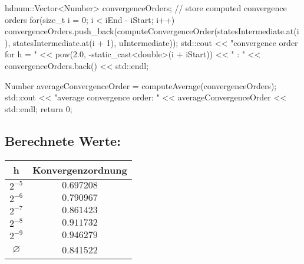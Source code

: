 \documentclass[10pt,oneside,a4paper]{scrartcl}
\begin{document}
\begin{cppcode}
{    hdnum::Vector<Number> convergenceOrders;     // store computed convergence orders
    for(size_t i = 0; i < iEnd - iStart; i++) {
      convergenceOrders.push_back(computeConvergenceOrder(statesIntermediate.at(i), statesIntermediate.at(i + 1), uIntermediate));
      std::cout << "convergence order for h = " << pow(2.0, -static_cast<double>(i + iStart)) << " : " << convergenceOrders.back() << std::endl;
    }

    Number averageConvergenceOrder = computeAverage(convergenceOrders);
    std::cout << "average convergence order: " << averageConvergenceOrder << std::endl;
    return 0;
}
    \end{cppcode}
    
    \subsection*{Berechnete Werte:}
    
    \begin{center}
        \begin{tabular}[htbp]{c|c}
        h & Konvergenzordnung \\
        \hline
        $2^{-5}$ & $0.697208$ \\
        $2^{-6}$ & $0.790967$ \\
        $2^{-7}$ & $0.861423$ \\
        $2^{-8}$ & $0.911732$ \\
        $2^{-9}$ & $0.946279$ \\
        \hline
        \hline
        $\varnothing$ & 0.841522
        \end{tabular}
    \end{center}
\end{document}
